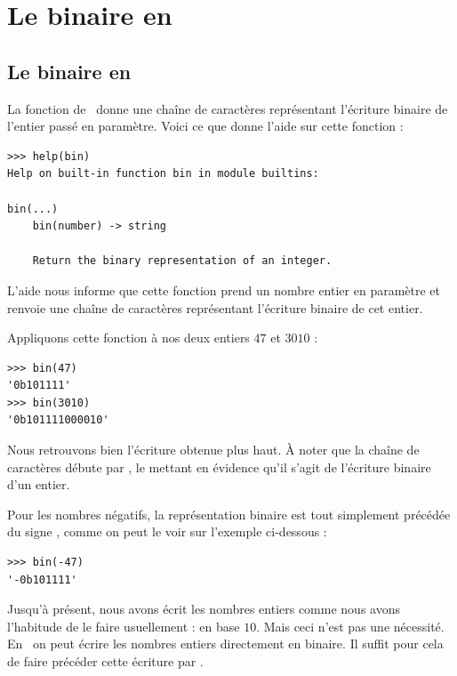 \documentclass[class=report,crop=false]{standalone}
\begin{document}
\section{Le binaire en \Python}

\subsection{Le binaire en \Python}

La fonction  de \Python\ donne une chaîne de caractères
représentant l'écriture binaire de l'entier passé en paramètre. Voici ce
que donne l'aide sur cette fonction :

\begin{lstlisting}
>>> help(bin)
Help on built-in function bin in module builtins:

bin(...)
    bin(number) -> string

    Return the binary representation of an integer.  
\end{lstlisting}

L'aide nous informe que cette fonction prend un nombre entier en
paramètre et renvoie une chaîne de caractères représentant l'écriture
binaire de cet entier.

Appliquons cette fonction à nos deux entiers $47$ et $3010$ :

\begin{lstlisting}
>>> bin(47)
'0b101111'
>>> bin(3010)
'0b101111000010'  
\end{lstlisting}

Nous retrouvons bien l'écriture obtenue plus haut.
À noter que la chaîne de caractères débute par , le
 mettant en évidence qu'il s'agit de l'écriture binaire d'un
entier.

Pour les nombres négatifs, la représentation binaire est tout simplement
précédée du signe \codeinline{-}, comme on peut le voir sur l'exemple
ci-dessous :

\begin{lstlisting}
>>> bin(-47)
'-0b101111'  
\end{lstlisting}

Jusqu'à présent, nous avons écrit les nombres entiers comme nous avons
l'habitude de le faire usuellement : en base $10$. Mais ceci n'est pas une
nécessité. En \Python\ on peut écrire les nombres entiers directement en
binaire. Il suffit pour cela de faire précéder cette écriture par
.
\end{document}
